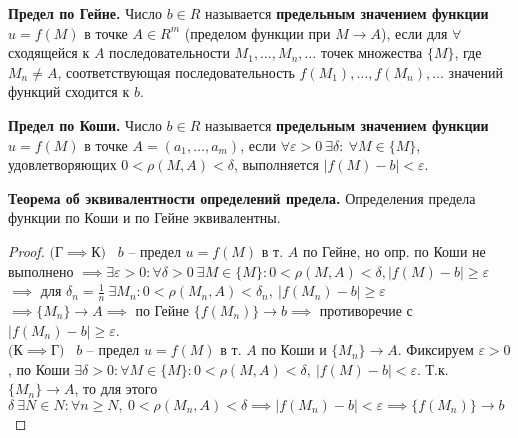 
\bigbreak
\textbf{Предел по Гейне.} Число $b \in R$ называется \textbf{предельным значением функции} $u = f(M)$ в точке $A \in R^m$ (пределом функции при $M \to A$), если для $\forall$ сходящейся к $A$ последовательности $M_1, \dots, M_n, \dots$ точек множества $\{M\}$, где $M_n \neq A$, соответствующая последовательность $f(M_1),\dots,f(M_n), \dots$ значений функций сходится к $b$.

\bigbreak
\textbf{Предел по Коши.} Число $b \in R$ называется \textbf{предельным значением функции} $u = f(M)$ в точке $A = (a_1, \dots, a_m)$, если $\forall \varepsilon > 0 ~ \exists \delta: ~ \forall M \in \{M\}$, удовлетворяющих $0 < \rho(M, A) < \delta$, выполняется $|f(M) - b| < \varepsilon$.

\bigbreak
\textbf{Теорема об эквивалентности определений предела.} Определения предела функции по Коши и по Гейне эквивалентны.

\begin{proof}
$($Г$\implies$К$)$ \mathLet \ $b$ -- предел $u=f(M)$ в т. $A$ по Гейне, но опр. по Коши не выполнено
$\implies \exists \varepsilon > 0: \forall \delta > 0 ~ \exists M \in \{M\}: 0 < \rho(M,A) < \delta, \left|f(M)-b\right| \geq \varepsilon$
$\implies$ для $\delta_n=\frac{1}{n} ~ \exists M_n: 0<\rho(M_n,A)<\delta_n, ~ \left|f(M_n)-b\right| \geq \varepsilon$
$\implies \{M_n\} \to A \implies$ по Гейне $\{f(M_n)\} \to b \implies$ противоречие с $\left|f(M_n)-b\right| \geq \varepsilon$. \\
$($К$\implies$Г$)$ \mathLet \ $b$ -- предел $u=f(M)$ в т. $A$ по Коши и $\{M_n\} \to A$. Фиксируем $\varepsilon > 0$, по Коши $\exists \delta > 0: \forall M \in \{M\}: 0 < \rho(M,A) < \delta, ~ \left|f(M)-b\right| < \varepsilon$. 
Т.к. $\{M_n\} \to A$, то для этого $\delta ~ \exists N \in N: \forall n \geq N, ~ 0 < \rho(M_n, A) < \delta \implies \left|f(M_n)-b\right| < \varepsilon \implies \{f(M_n)\} \to b$
\end{proof}

